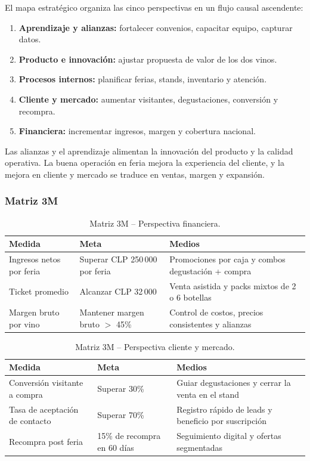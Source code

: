 \documentclass[10pt,a4paper]{article}
\begin{document}
El mapa estrat\'egico organiza las cinco perspectivas en un flujo causal ascendente:

\begin{enumerate}[nosep]
    \item \textbf{Aprendizaje y alianzas:} fortalecer convenios, capacitar equipo, capturar datos.
    \item \textbf{Producto e innovaci\'on:} ajustar propuesta de valor de los dos vinos.
    \item \textbf{Procesos internos:} planificar ferias, stands, inventario y atenci\'on.
    \item \textbf{Cliente y mercado:} aumentar visitantes, degustaciones, conversi\'on y recompra.
    \item \textbf{Financiera:} incrementar ingresos, margen y cobertura nacional.
\end{enumerate}

Las alianzas y el aprendizaje alimentan la innovaci\'on del producto y la calidad operativa. La buena operaci\'on en feria mejora la experiencia del cliente, y la mejora en cliente y mercado se traduce en ventas, margen y expansi\'on.

\subsubsection{Matriz 3M}

\begin{table}[H]
\centering
\caption{Matriz 3M -- Perspectiva financiera.}
\label{tab:3m_fin}
\small
\begin{tabular}{p{4cm} p{4.5cm} p{5.3cm}}
\toprule
\textbf{Medida} & \textbf{Meta} & \textbf{Medios} \\
\midrule
Ingresos netos por feria & Superar CLP 250\,000 por feria & Promociones por caja y combos degustaci\'on + compra \\
Ticket promedio & Alcanzar CLP 32\,000 & Venta asistida y packs mixtos de 2 o 6 botellas \\
Margen bruto por vino & Mantener margen bruto $>$ 45\% & Control de costos, precios consistentes y alianzas \\
\bottomrule
\end{tabular}
\end{table}

\begin{table}[H]
\centering
\caption{Matriz 3M -- Perspectiva cliente y mercado.}
\label{tab:3m_cli}
\small
\begin{tabular}{p{4cm} p{4.5cm} p{5.3cm}}
\toprule
\textbf{Medida} & \textbf{Meta} & \textbf{Medios} \\
\midrule
Conversi\'on visitante a compra & Superar 30\% & Guiar degustaciones y cerrar la venta en el stand \\
Tasa de aceptaci\'on de contacto & Superar 70\% & Registro r\'apido de leads y beneficio por suscripci\'on \\
Recompra post feria & 15\% de recompra en 60 d\'ias & Seguimiento digital y ofertas segmentadas \\
\bottomrule
\end{tabular}
\end{table}
\end{document}
